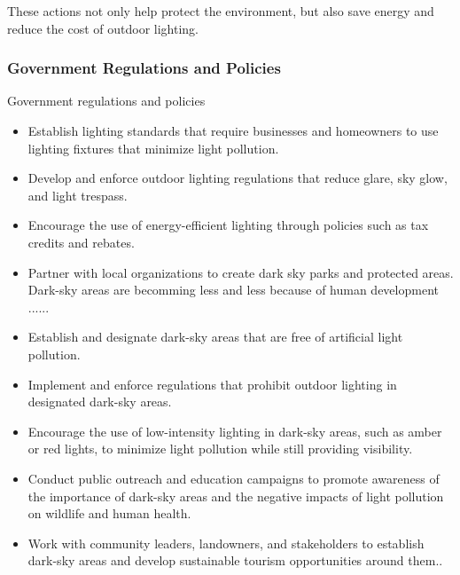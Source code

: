 These actions not only help protect the environment, but also save energy and reduce the cost of outdoor lighting.

\subsubsection{Government Regulations and Policies}
Government regulations and policies
\begin{itemize}
    \item Establish lighting standards that require businesses and homeowners to use lighting fixtures that minimize light pollution.
    
    \item Develop and enforce outdoor lighting regulations that reduce glare, sky glow, and light trespass.
    
    \item Encourage the use of energy-efficient lighting through policies such as tax credits and rebates.
    \item Partner with local organizations to create dark sky parks and protected areas.
    Dark-sky areas are becomming less and less because of human development ......

    \item Establish and designate dark-sky areas that are free of artificial light pollution.

    \item Implement and enforce regulations that prohibit outdoor lighting in designated dark-sky areas.

    \item Encourage the use of low-intensity lighting in dark-sky areas, such as amber or red lights, to minimize light pollution while still providing visibility.

    \item Conduct public outreach and education campaigns to promote awareness of the importance of dark-sky areas and the negative impacts of light pollution on wildlife and human health.

    \item Work with community leaders, landowners, and stakeholders to establish dark-sky areas and develop sustainable tourism opportunities around them..
\end{itemize}


